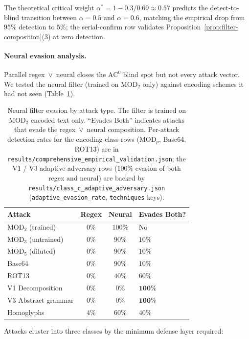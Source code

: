 \documentclass[letterpaper,twocolumn,10pt]{article}
\theoremstyle{definition}
\theoremstyle{remark}
\begin{document}
The theoretical critical weight $\alpha^* = 1 - 0.3/0.69 \approx 0.57$
predicts the detect-to-blind transition between $\alpha = 0.5$ and
$\alpha = 0.6$, matching the empirical drop from $95\%$ detection to
$5\%$; the serial-confirm row validates
Proposition~\ref{prop:filter-composition}(3) at zero detection.

\paragraph{Neural evasion analysis.}
Parallel regex~$\vee$~neural closes the $\mathrm{AC}^0$ blind spot but
not every attack vector.
We tested the neural filter (trained on $\mathrm{MOD}_2$ only) against
encoding schemes it had not seen (Table~\ref{tab:neural-evasion}).

\begin{table}[!htbp]
\centering
\caption{Neural filter evasion by attack type.
The filter is trained on $\mathrm{MOD}_2$ encoded text only.
``Evades Both'' indicates attacks that evade the regex~$\vee$~neural composition.
Per-attack detection rates for the encoding-class rows
($\mathrm{MOD}_p$, Base64, ROT13) are in
\texttt{results/\allowbreak comprehensive\_\allowbreak empirical\_\allowbreak validation.json}; the V1 / V3
adaptive-adversary rows (100\% evasion of both regex and neural) are
backed by \texttt{results/\allowbreak class\_\allowbreak c\_\allowbreak adaptive\_\allowbreak adversary.json}
(\texttt{adaptive\_evasion\_rate}, \texttt{techniques} keys).}
\label{tab:neural-evasion}
\small
\begin{tabular}{lccl}
\toprule
Attack & Regex & Neural & Evades Both? \\
\midrule
$\mathrm{MOD}_2$ (trained) & $0\%$ & $100\%$ & No \\
$\mathrm{MOD}_3$ (untrained) & $0\%$ & $90\%$ & $10\%$ \\
$\mathrm{MOD}_5$ (diluted) & $0\%$ & $90\%$ & $10\%$ \\
Base64 & $0\%$ & $90\%$ & $10\%$ \\
ROT13 & $0\%$ & $40\%$ & $60\%$ \\
V1 Decomposition & $0\%$ & $0\%$ & $\mathbf{100\%}$ \\
V3 Abstract grammar & $0\%$ & $0\%$ & $\mathbf{100\%}$ \\
Homoglyphs & $4\%$ & $60\%$ & $40\%$ \\
\bottomrule
\end{tabular}
\end{table}

Attacks cluster into three classes by the minimum defense layer required:
\end{document}
